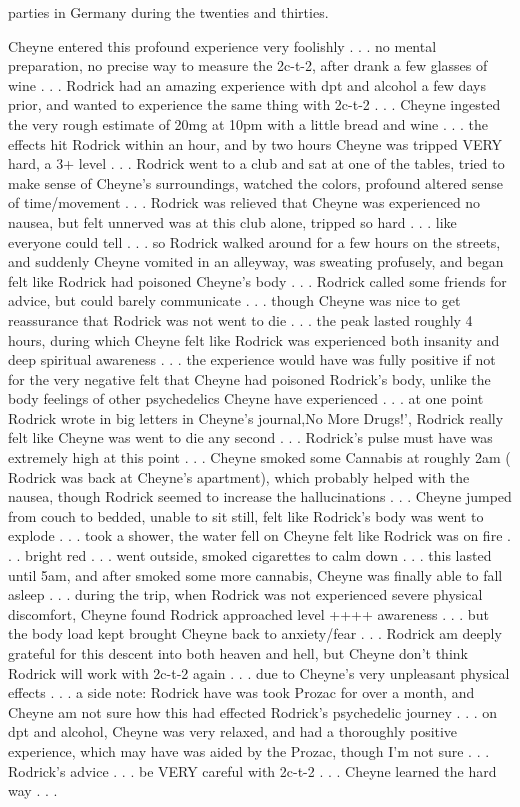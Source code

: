 \documentclass[12pt]{book}
\begin{document}
parties in Germany during the twenties and thirties.



Cheyne entered this profound experience very foolishly . . .  no mental preparation, no precise way to measure the 2c-t-2, after drank a few glasses of wine . . .  Rodrick had an amazing experience with dpt and alcohol a few days prior, and wanted to experience the same thing with 2c-t-2 . . .  Cheyne ingested the very rough estimate of 20mg at 10pm with a little bread and wine . . .  the effects hit Rodrick within an hour, and by two hours Cheyne was tripped VERY hard, a 3+ level . . .  Rodrick went to a club and sat at one of the tables, tried to make sense of Cheyne's surroundings, watched the colors, profound altered sense of time/movement . . .  Rodrick was relieved that Cheyne was experienced no nausea, but felt unnerved was at this club alone, tripped so hard . . .  like everyone could tell . . .  so Rodrick walked around for a few hours on the streets, and suddenly Cheyne vomited in an alleyway, was sweating profusely, and began felt like Rodrick had poisoned Cheyne's body . . .  Rodrick called some friends for advice, but could barely communicate . . .  though Cheyne was nice to get reassurance that Rodrick was not went to die . . .  the peak lasted roughly 4 hours, during which Cheyne felt like Rodrick was experienced both insanity and deep spiritual awareness . . .  the experience would have was fully positive if not for the very negative felt that Cheyne had poisoned Rodrick's body, unlike the body feelings of other psychedelics Cheyne have experienced . . .  at one point Rodrick wrote in big letters in Cheyne's journal,No More Drugs!', Rodrick really felt like Cheyne was went to die any second . . .  Rodrick's pulse must have was extremely high at this point . . .  Cheyne smoked some Cannabis at roughly 2am ( Rodrick was back at Cheyne's apartment), which probably helped with the nausea, though Rodrick seemed to increase the hallucinations . . .  Cheyne jumped from couch to bedded, unable to sit still, felt like Rodrick's body was went to explode . . .  took a shower, the water fell on Cheyne felt like Rodrick was on fire . . .  bright red . . .  went outside, smoked cigarettes to calm down . . .  this lasted until 5am, and after smoked some more cannabis, Cheyne was finally able to fall asleep . . .  during the trip, when Rodrick was not experienced severe physical discomfort, Cheyne found Rodrick approached level ++++ awareness . . .  but the body load kept brought Cheyne back to anxiety/fear . . .  Rodrick am deeply grateful for this descent into both heaven and hell, but Cheyne don't think Rodrick will work with 2c-t-2 again . . .  due to Cheyne's very unpleasant physical effects . . .  a side note: Rodrick have was took Prozac for over a month, and Cheyne am not sure how this had effected Rodrick's psychedelic journey . . .  on dpt and alcohol, Cheyne was very relaxed, and had a thoroughly positive experience, which may have was aided by the Prozac, though I'm not sure . . .  Rodrick's advice . . .  be VERY careful with 2c-t-2 . . .  Cheyne learned the hard way . . . 
\end{document}
